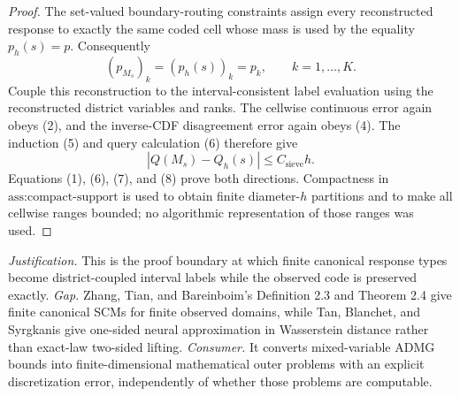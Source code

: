\documentclass{article}
\begin{document}
\begin{proof}
The set-valued boundary-routing constraints assign every reconstructed response to exactly the same coded cell whose mass is used by the equality \(p_h(s)=p\).  Consequently
\[
(p_{M_s})_k=(p_h(s))_k=p_k,
\qquad k=1,\ldots,K.                                               \tag{7}
\]
Couple this reconstruction to the interval-consistent label evaluation using the reconstructed district variables and ranks.  The cellwise continuous error again obeys (2), and the inverse-CDF disagreement error again obeys (4).  The induction (5) and query calculation (6) therefore give
\[
|Q(M_s)-Q_h(s)|\leq C_{\mathrm{sieve}}h.                          \tag{8}
\]
Equations (1), (6), (7), and (8) prove both directions.  Compactness in \(\text{ass:compact-support}\) is used to obtain finite diameter-\(h\) partitions and to make all cellwise ranges bounded; no algorithmic representation of those ranges was used.
\end{proof}
\par\smallskip\noindent \textit{Justification.} This is the proof boundary at which finite canonical response types become district-coupled interval labels while the observed code is preserved exactly. \textit{Gap.} Zhang, Tian, and Bareinboim's Definition 2.3 and Theorem 2.4 give finite canonical SCMs for finite observed domains, while Tan, Blanchet, and Syrgkanis give one-sided neural approximation in Wasserstein distance rather than exact-law two-sided lifting. \textit{Consumer.} It converts mixed-variable ADMG bounds into finite-dimensional mathematical outer problems with an explicit discretization error, independently of whether those problems are computable.
\end{document}
